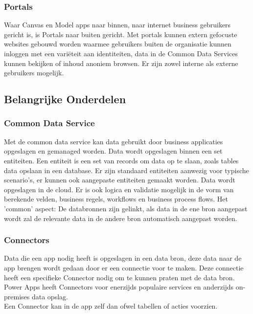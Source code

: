 \subsubsection{Portals}

Waar Canvas en Model apps naar binnen, naar internet business gebruikers gericht is, is Portals naar buiten gericht. Met portals kunnen extern gefocuste websites gebouwd worden waarmee gebruikers buiten de organisatie kunnen inloggen met een variëteit aan identiteiten, data in de Common Data Services kunnen bekijken of inhoud anoniem browsen. Er zijn zowel interne als externe gebruikers mogelijk. \autocite{MicrosoftDocs2020a}

\subsection{Belangrijke Onderdelen}

\subsubsection{Common Data Service}

Met de common data service kan data gebruikt door business applicaties opgeslagen en gemanaged worden. Data wordt opgeslagen binnen een set entiteiten. Een entiteit is een set van records om data op te slaan, zoals tables data opslaan in een database. Er zijn standaard entiteiten aanwezig voor typische scenario's, er kunnen ook aangepaste entiteiten gemaakt worden. Data wordt opgeslagen in de cloud. Er is ook logica en validatie mogelijk in de vorm van berekende velden, business regels, workflows en business process flows. Het 'common' aspect: De databronnen zijn gelinkt, als data in de ene bron aangepast wordt zal de relevante data in de andere bron automatisch aangepast worden. \autocite{MicrosoftDocs2019a}

\subsubsection{Connectors}

Data die een app nodig heeft is opgeslagen in een data bron, deze data naar de app brengen wordt gedaan door er een connectie voor te maken. Deze connectie heeft een specifieke Connector nodig om te kunnen praten met de data bron. Power Apps heeft Connectors voor enerzijds populaire services en anderzijds on-premises data opslag. \\
Een Connector kan in de app zelf dan ofwel tabellen of acties voorzien.

